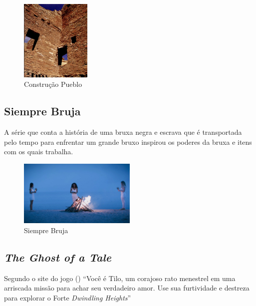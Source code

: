 \begin{figure}[!htb] \caption{\label{fig_puebloan}Construção Pueblo} \begin{center}
\includegraphics[width=0.3\textwidth]{imagens/puebloans.png} \end{center}
 \end{figure}


\vfill \pagebreak

\subsection{Siempre Bruja}

A série que conta a história de uma bruxa negra e escrava que é transportada
pelo tempo para enfrentar um grande bruxo inspirou os poderes da bruxa e itens
com os quais trabalha.

\begin{figure}[!htb] \caption{\label{siempre}Siempre Bruja} \begin{center}
\includegraphics[width=0.5\textwidth]{imagens/SiempreBruja.jpg} \end{center}
 \end{figure}


\subsection{\textit{The Ghost of a Tale}} Segundo o site do jogo (\citeyear{Ghostofa36:online})  ``Você é Tilo,
um corajoso rato menestrel em uma arriscada missão para achar seu verdadeiro
amor. Use sua furtividade e destreza para explorar o Forte \textit{Dwindling
Heights}''

